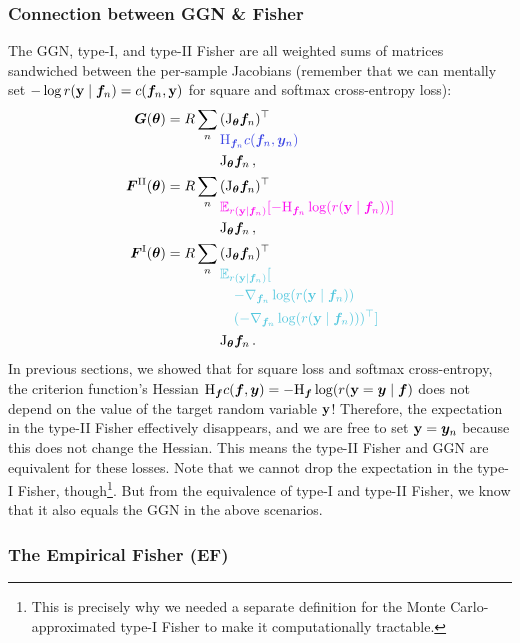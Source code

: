 \subsubsection{Connection between GGN \& Fisher}\label{subsec:connection-ggn-fisher}
The GGN, type-I, and type-II Fisher are all weighted sums of matrices sandwiched between the per-sample Jacobians (remember that we can mentally set $-\log r({\mathbf{y}} \mid {\bm{f}}_n) = c({\bm{f}}_n, {\mathbf{y}})$ for square and softmax cross-entropy loss):
\begin{align*}
  \mG(\vtheta)
  & =
    R \sum_n
    \begin{aligned}[t]
      & (\jac_{\vtheta}\vf_n)^\top                           \\
      & \textcolor{VectorBlue}{\hess_{\vf_n}c(\vf_n, \vy_n)} \\
      & \jac_{\vtheta}\vf_n\,,
    \end{aligned}
  \\
  \mF^{\text{II}}(\vtheta)
  & =
    R \sum_n
    \begin{aligned}[t]
      & (\jac_{\vtheta}\vf_n)^\top                                                                 \\
      & \textcolor{VectorPink}{\E_{r(\rvy \mid \vf_n)}[-\hess_{\vf_n} \log( r(\rvy \mid \vf_n)) ]} \\
      & \jac_{\vtheta}\vf_n\,,
    \end{aligned}
  \\
  \mF^{\text{I}}(\vtheta)
  & =
    R \sum_n
    \begin{aligned}[t]
      & (\jac_{\vtheta}\vf_n)^\top
      \\
      & \colored[VectorTeal]{\E_{r(\rvy \mid \vf_n)}[}
      \\
      &\begin{aligned}[t]
        &\quad \colored[VectorTeal]{-\nabla_{\vf_n} \log( r(\rvy \mid \vf_n))}
        \\
        &\quad \colored[VectorTeal]{(-\nabla_{\vf_n} \log( r(\rvy \mid \vf_n)))^{\top}]}
      \end{aligned}
      \\
      & \jac_{\vtheta}\vf_n\,.
    \end{aligned}
\end{align*}
In previous sections, we showed that for square loss and softmax cross-entropy, the criterion function's Hessian $\mathrm{H}_{\bm{f}} c({\bm{f}}, {\bm{y}}) = -\mathrm{H}_{{\bm{f}}} \log( r({\mathbf{y}} = {\bm{y}} \mid {\bm{f}})$ does not depend on the value of the target random variable ${\mathbf{y}}$!
Therefore, the expectation in the type-II Fisher effectively disappears, and we are free to set ${\mathbf{y}} = {\bm{y}}_n$ because this does not change the Hessian.
This means the type-II Fisher and GGN are equivalent for these losses.
Note that we cannot drop the expectation in the type-I Fisher, though\footnote{This is precisely why we needed a separate definition for the Monte Carlo-approximated type-I Fisher to make it computationally tractable.}.
But from the equivalence of type-I and type-II Fisher, we know that it also equals the GGN in the above scenarios.

\subsubsection{The Empirical Fisher (EF)}\label{sec:emp_fisher}


